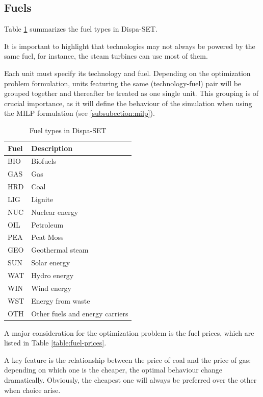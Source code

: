 \subsection{Fuels}

Table \ref{table:fuels-eu} summarizes the fuel types in Dispa-SET.

It is important to highlight that technologies may not always be powered by the same fuel, for instance, the steam turbines can use most of them.

Each unit must specify its technology and fuel. Depending on the optimization problem formulation, units featuring the same (technology-fuel) pair will be grouped together and thereafter be treated as one single unit. This grouping is of crucial importance, as it will define the behaviour of the simulation when using the MILP formulation (see \ref{subsubection:milp}).

\begin{table}[h]
    \centering
	\begin{tabular}{|l l|}
		\hline
		Fuel & Description\\
		\hline
		BIO & Biofuels\\
		GAS & Gas\\
		HRD & Coal\\
		LIG & Lignite \\
		NUC & Nuclear energy\\
		OIL & Petroleum\\
		PEA & Peat Moss\\
		GEO & Geothermal steam \\
		SUN & Solar energy\\
		WAT & Hydro energy\\
		WIN & Wind energy\\
		WST & Energy from waste\\
		OTH & Other fuels and energy carriers\\
		\hline
	\end{tabular}
	\caption{Fuel types in Dispa-SET}
	\label{table:fuels-eu}
\end{table}

A major consideration for the optimization problem is the fuel prices, which are listed in Table \ref{table:fuel-prices}.

A key feature is the relationship between the price of coal and the price of gas: depending on which one is the cheaper, the optimal behaviour change dramatically. Obviously, the cheapest one will always be preferred over the other when choice arise. 

